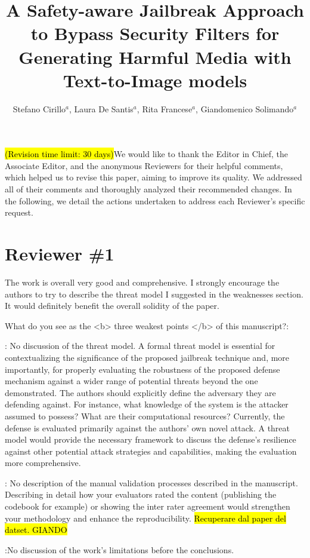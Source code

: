 \documentclass{ar2rc}
\title{A Safety-aware Jailbreak Approach to Bypass Security Filters for Generating Harmful Media with Text-to-Image models}
\author{Stefano Cirillo$^a$, Laura De Santis$^a$, Rita Francese$^a$, Giandomenico Solimando$^a$}
\affiliation{$^a$Department of Computer Science, University of Salerno, Fisciano, Italy}
\begin{document}
\maketitle
\vspace{-0.2cm}

{\hl{(Revision time limit: 30 days)}We would like to thank the Editor in Chief, the Associate Editor, and the anonymous Reviewers for their helpful comments, which helped us to revise this paper, aiming to improve its quality. We addressed all of their comments and thoroughly analyzed their recommended changes. In the following, we detail the actions undertaken to address each Reviewer's specific request.}


\section{Reviewer \#1} 

\RC The work is overall very good and comprehensive.
I strongly encourage the authors to try to describe the threat model I suggested in the weaknesses section. It would definitely benefit the overall solidity of the paper.

\RC What do you see as the <b> three weakest points </b> of this manuscript?: 

    : No discussion of the threat model. A formal threat model is essential for contextualizing the significance of the proposed jailbreak technique and, more importantly, for properly evaluating the robustness of the proposed defense mechanism against a wider range of potential threats beyond the one demonstrated. The authors should explicitly define the adversary they are defending against. For instance, what knowledge of the system is the attacker assumed to possess? What are their computational resources? Currently, the defense is evaluated primarily against the authors' own novel attack. A threat model would provide the necessary framework to discuss the defense's resilience against other potential attack strategies and capabilities, making the evaluation more comprehensive.

    
    : No description of the manual validation processes described in the manuscript. Describing in detail how your evaluators rated the content (publishing the codebook for example) or showing the inter rater agreement would strengthen your methodology and enhance the reproducibility.
    \hl{Recuperare dal paper del datset. GIANDO}

    
    :No discussion of the work’s limitations before the conclusions.
\end{document}
